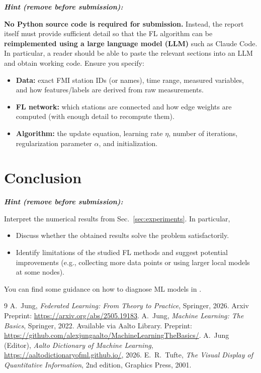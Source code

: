 \documentclass{article}
\newenvironment{hint}{%
	\par\medskip\noindent
	\begin{minipage}[t]{\dimexpr\columnwidth-8mm}%
	\raggedright\itshape
	\textbf{Hint (remove before submission):}\space
}{%
	\end{minipage}\par\medskip
}
\begin{document}
\begin{hint}
\textbf{No Python source code is required for submission.}
Instead, the report itself must provide sufficient detail so that the
FL algorithm can be \textbf{reimplemented using a large language model (LLM)}
such as Claude Code.
In particular, a reader should be able to paste the relevant sections
into an LLM and obtain working code. Ensure you specify:
\begin{itemize}
	\item \textbf{Data:} exact FMI station IDs (or names), time range, measured
	variables, and how features/labels are derived from raw measurements.
	\item \textbf{FL network:} which stations are connected and how edge weights
	are computed (with enough detail to recompute them).
	\item \textbf{Algorithm:} the update equation, learning rate $\eta$, number of
	iterations, regularization parameter $\alpha$, and initialization.
\end{itemize}
\end{hint}



\section{Conclusion}
\label{sec:conclusion}
\begin{hint}
Interpret the numerical results from Sec.~\ref{sec:experiments}.
In particular,
\begin{itemize}
	\item Discuss whether the obtained results solve the problem satisfactorily.
	\item Identify limitations of the studied FL methods and suggest potential improvements (e.g.,
	collecting more data points or using larger local models at some nodes).
\end{itemize}
You can find some guidance on how to diagnose ML models in \cite[Sec.~6.6]{Jung2022}.
\end{hint}



\begin{thebibliography}{9}
	 A.~Jung, \textit{Federated Learning: From Theory to Practice}, Springer, 2026. Arxiv Preprint: \url{https://arxiv.org/abs/2505.19183}.
	 A.~Jung, \textit{Machine Learning: The Basics}, Springer, 2022. Available via Aalto Library. Preprint: \url{https://github.com/alexjungaalto/MachineLearningTheBasics/}.
	 A.~Jung (Editor), \textit{Aalto Dictionary of Machine Learning}, \url{https://aaltodictionaryofml.github.io/}, 2026.
	E.~R.~Tufte,
	\emph{The Visual Display of Quantitative Information},
	2nd edition, Graphics Press, 2001.
\end{thebibliography}
\end{document}
